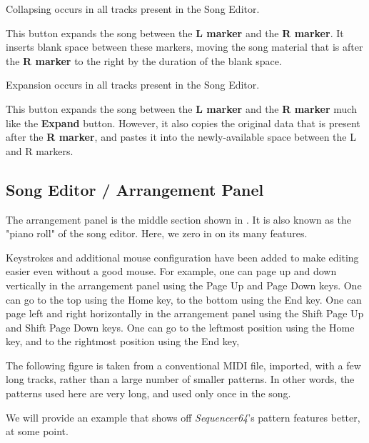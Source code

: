    Collapsing occurs in all tracks present in the Song Editor.

   This button expands the song between the
   \textbf{L marker} and the \textbf{R marker}.
   It inserts blank space between these markers, moving the song material
   that is after the \textbf{R marker}
   to the right by the duration of the blank space.

   Expansion occurs in all tracks present in the Song Editor.

   This button expands the song between the \textbf{L marker} and the
   \textbf{R marker} much like the \textbf{Expand} button.
   However, it also copies the original data that is present after the
   \textbf{R marker}, and pastes it into the newly-available space between
   the L and R markers.

\subsection{Song Editor / Arrangement Panel}
\label{subsec:seq64_song_editor_arrangement_panel}

   The arrangement panel is the middle section shown in
   .  It is also known as the
   "piano roll" of the song editor. Here, we zero in on its many
   features.

   Keystrokes and additional mouse configuration have been added to make
   editing easier even without a good mouse.
   For example, one can page up and down vertically in the arrangement
   panel using the
    Page Up and 
    Page Down keys.
   One can go to the top using the 
    Home key,
   to the bottom using the
    End key.
   One can page left and right horizontally in the arrangement
   panel using the
    Shift Page Up and 
    Shift Page Down keys.
   One can go to the leftmost position using the 
    Home key,
   and to the rightmost position using the
    End key,

   The following figure is taken from a conventional MIDI file, imported,
   with a few long tracks, rather than a large number of smaller patterns.
   In other words, the patterns used here are very long, and used only once
   in the song.
   
   We will provide an example that shows off \textsl{Sequencer64}'s
   pattern features better, at some point.

